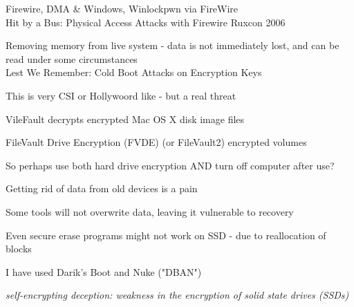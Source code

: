 \documentclass[Screen16to9,17pt]{foils}
\begin{document}

\begin{list1}
\item Firewire, DMA \& Windows, Winlockpwn via FireWire\\
Hit by a Bus: Physical Access Attacks with Firewire Ruxcon 2006
\vskip 5mm
\item Removing memory from live system - data is not immediately lost, and can be read under some circumstances\\
Lest We Remember: Cold Boot Attacks on Encryption Keys\\
\item This is very CSI or Hollywoord like - but a real threat
\item VileFault decrypts encrypted Mac OS X disk image files\\ 

\item  FileVault Drive Encryption (FVDE) (or FileVault2) encrypted volumes\\
\end{list1}

\centerline{So perhaps use both hard drive encryption AND turn off computer after use?}



\begin{list1}
\item Getting rid of data from old devices is a pain
\item Some tools will not overwrite data, leaving it vulnerable to recovery
\item Even secure erase programs might not work on SSD - due to reallocation of blocks
\item I have used Darik's Boot and Nuke ("DBAN") 
\end{list1}



\emph{self-encrypting deception: weakness in the encryption of solid state drives (SSDs)}\\





\end{document}
